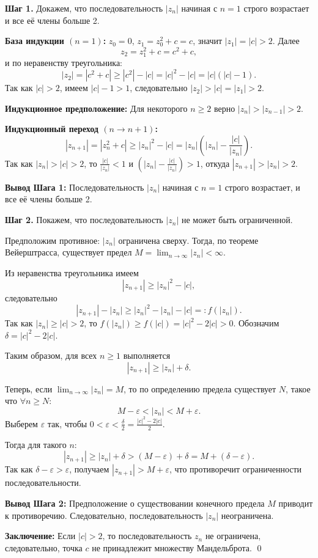 \documentclass[a4paper,12pt]{article}
\begin{document}
\textbf{Шаг 1.} Докажем, что последовательность $|z_{n}|$ начиная с $n=1$ строго возрастает и все её члены больше 2.

\textbf{База индукции $(n=1)$:} $z_{0}=0$, $z_{1}=z_{0}^{2}+c=c$, значит $|z_{1}|=|c|>2$. Далее
$$
z_{2}=z_{1}^{2}+c=c^{2}+c,
$$
и по неравенству треугольника:
$$
|z_{2}|=|c^{2}+c|\ge |c^{2}|-|c|=|c|^{2}-|c|=|c|(|c|-1).
$$
Так как $|c|>2$, имеем $|c|-1>1$, следовательно $|z_{2}|>|c|=|z_{1}|>2$.

\textbf{Индукционное предположение:} Для некоторого $n\ge 2$ верно $|z_{n}|>|z_{n-1}|>2$.

\textbf{Индукционный переход $(n\to n+1)$:}
$$
|z_{n+1}|=|z_{n}^{2}+c|\ge |z_{n}|^{2}-|c|=|z_{n}|\left(|z_{n}|-\frac{|c|}{|z_{n}|}\right).
$$
Так как $|z_{n}|>|c|>2$, то $\frac{|c|}{|z_{n}|}<1$ и $(|z_{n}|-\frac{|c|}{|z_{n}|})>1$, откуда $|z_{n+1}|>|z_{n}|>2$.

\textbf{Вывод Шага 1:} Последовательность $|z_{n}|$ начиная с $n=1$ строго возрастает, и все её члены больше 2.

\textbf{Шаг 2.} Покажем, что последовательность $|z_{n}|$ не может быть ограниченной.

Предположим противное: $|z_{n}|$ ограничена сверху. Тогда, по теореме Вейерштрасса, существует предел $M=\lim_{n\to\infty}|z_{n}|<\infty$.

Из неравенства треугольника имеем
$$
|z_{n+1}|\ge |z_{n}|^{2}-|c|,
$$
следовательно
$$
|z_{n+1}|-|z_{n}|\ge |z_{n}|^{2}-|z_{n}|-|c|=:f(|z_{n}|).
$$
Так как $|z_{n}|\ge |c|>2$, то $f(|z_{n}|)\ge f(|c|)=|c|^{2}-2|c|>0$. Обозначим $\delta = |c|^{2}-2|c|$.

Таким образом, для всех $n\ge 1$ выполняется
$$
|z_{n+1}| \ge |z_{n}|+\delta.
$$

Теперь, если $\lim_{n\to\infty}|z_{n}|=M$, то по определению предела существует $N$, такое что $\forall n\ge N$:
$$
M-\varepsilon<|z_{n}|<M+\varepsilon.
$$
Выберем $\varepsilon$ так, чтобы $0<\varepsilon<\frac{\delta}{2}=\frac{|c|^{2}-2|c|}{2}$.

Тогда для такого $n$:
$$
|z_{n+1}| \ge |z_{n}|+\delta > (M-\varepsilon)+\delta = M + (\delta-\varepsilon).
$$
Так как $\delta-\varepsilon>\varepsilon$, получаем $|z_{n+1}|>M+\varepsilon$, что противоречит ограниченности последовательности.

\textbf{Вывод Шага 2:} Предположение о существовании конечного предела $M$ приводит к противоречию. Следовательно, последовательность $|z_{n}|$ неограничена.

\textbf{Заключение:} Если $|c|>2$, то последовательность $z_{n}$ не ограничена, следовательно, точка $c$ не принадлежит множеству Мандельброта. \qed
\end{document}
